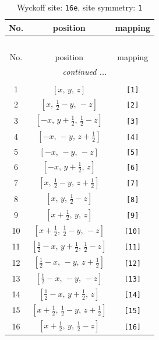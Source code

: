 \documentclass[fleqn,8pt]{jsarticle}
\begin{document}
\begin{longtable}{ccc}
\caption{Wyckoff site: {\tt 16e}, site symmetry: {\tt 1}}
 \\
 \hline \hline
No. & position & mapping \\ \hline \endfirsthead

\multicolumn{2}{l}{\tablename\ \thetable{}} \\
 \hline \hline
No. & position & mapping \\ \hline \endhead

 \hline \hline
\multicolumn{2}{r}{\footnotesize\it continued ...} \\ \endfoot

 \hline \hline
\multicolumn{2}{r}{} \\ \endlastfoot

1 & $\left[ x,\, y,\, z \right]$ & {\tt [1]} \\ \hline
2 & $\left[ x,\, \frac{1}{2} - y,\, - z \right]$ & {\tt [2]} \\ \hline
3 & $\left[ - x,\, y + \frac{1}{2},\, \frac{1}{2} - z \right]$ & {\tt [3]} \\ \hline
4 & $\left[ - x,\, - y,\, z + \frac{1}{2} \right]$ & {\tt [4]} \\ \hline
5 & $\left[ - x,\, - y,\, - z \right]$ & {\tt [5]} \\ \hline
6 & $\left[ - x,\, y + \frac{1}{2},\, z \right]$ & {\tt [6]} \\ \hline
7 & $\left[ x,\, \frac{1}{2} - y,\, z + \frac{1}{2} \right]$ & {\tt [7]} \\ \hline
8 & $\left[ x,\, y,\, \frac{1}{2} - z \right]$ & {\tt [8]} \\ \hline
9 & $\left[ x + \frac{1}{2},\, y,\, z \right]$ & {\tt [9]} \\ \hline
10 & $\left[ x + \frac{1}{2},\, \frac{1}{2} - y,\, - z \right]$ & {\tt [10]} \\ \hline
11 & $\left[ \frac{1}{2} - x,\, y + \frac{1}{2},\, \frac{1}{2} - z \right]$ & {\tt [11]} \\ \hline
12 & $\left[ \frac{1}{2} - x,\, - y,\, z + \frac{1}{2} \right]$ & {\tt [12]} \\ \hline
13 & $\left[ \frac{1}{2} - x,\, - y,\, - z \right]$ & {\tt [13]} \\ \hline
14 & $\left[ \frac{1}{2} - x,\, y + \frac{1}{2},\, z \right]$ & {\tt [14]} \\ \hline
15 & $\left[ x + \frac{1}{2},\, \frac{1}{2} - y,\, z + \frac{1}{2} \right]$ & {\tt [15]} \\ \hline
16 & $\left[ x + \frac{1}{2},\, y,\, \frac{1}{2} - z \right]$ & {\tt [16]} \\
\end{longtable}
\end{document}
